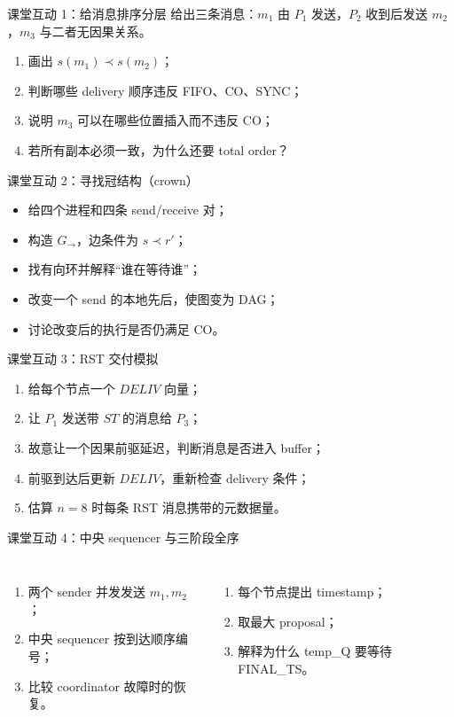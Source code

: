 \documentclass[UTF8,fontset=none,aspectratio=169,10pt]{beamer}
\begin{document}
{\begin{frame}{课堂互动 1：给消息排序分层}
给出三条消息：$m_1$ 由 $P_1$ 发送，$P_2$ 收到后发送 $m_2$，$m_3$ 与二者无因果关系。
\begin{enumerate}
  \item 画出 $s(m_1)\prec s(m_2)$；
  \item 判断哪些 delivery 顺序违反 FIFO、CO、SYNC；
  \item 说明 $m_3$ 可以在哪些位置插入而不违反 CO；
  \item 若所有副本必须一致，为什么还要 total order？
\end{enumerate}
\end{frame}

\begin{frame}{课堂互动 2：寻找冠结构（crown）}
\begin{itemize}
  \item 给四个进程和四条 send/receive 对；
  \item 构造 $G_{\rightarrow}$，边条件为 $s\prec r'$；
  \item 找有向环并解释“谁在等待谁”；
  \item 改变一个 send 的本地先后，使图变为 DAG；
  \item 讨论改变后的执行是否仍满足 CO。
\end{itemize}
\end{frame}

\begin{frame}{课堂互动 3：RST 交付模拟}
\begin{enumerate}
  \item 给每个节点一个 $DELIV$ 向量；
  \item 让 $P_1$ 发送带 $ST$ 的消息给 $P_3$；
  \item 故意让一个因果前驱延迟，判断消息是否进入 buffer；
  \item 前驱到达后更新 $DELIV$，重新检查 delivery 条件；
  \item 估算 $n=8$ 时每条 RST 消息携带的元数据量。
\end{enumerate}
\end{frame}

\begin{frame}{课堂互动 4：中央 sequencer 与三阶段全序}
\begin{columns}[T,onlytextwidth]
\begin{enumerate}
  \item 两个 sender 并发发送 $m_1,m_2$；
  \item 中央 sequencer 按到达顺序编号；
  \item 比较 coordinator 故障时的恢复。
\end{enumerate}
\begin{enumerate}
  \item 每个节点提出 timestamp；
  \item 取最大 proposal；
  \item 解释为什么 temp\_Q 要等待 FINAL\_TS。
\end{enumerate}
\end{columns}
\end{frame}

}
\end{document}

